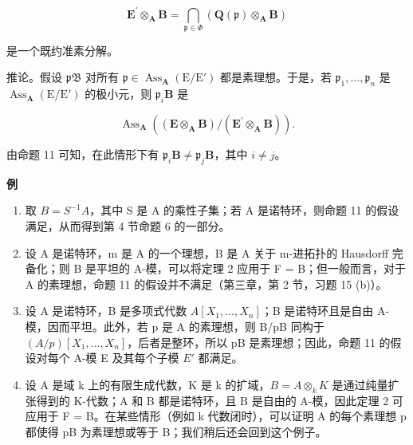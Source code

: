 \[
\mathbf {E} ^ {\prime} \otimes_ {\mathbf {A}} \mathbf {B} = \bigcap_ {\mathfrak {p} \in \Phi} (\mathbf {Q} (\mathfrak {p}) \otimes_ {\mathbf {A}} \mathbf {B})
\]

  是一个既约准素分解。

推论。假设 \(\mathfrak{pB}\) 对所有 \(\mathfrak{p} \in \operatorname{Ass}_{\mathbf{A}}(\mathrm{E}/\mathrm{E}')\) 都是素理想。于是，若 \(\mathfrak{p}_1, \ldots, \mathfrak{p}_n\) 是 \(\operatorname{Ass}_{\mathbf{A}}(\mathrm{E}/\mathrm{E}')\) 的极小元，则 \(\mathfrak{p}_i\mathbf{B}\) 是

\[
\operatorname{Ass} _ {\mathbf {A}} ((\mathbf {E} \otimes_ {\mathbf {A}} \mathbf {B}) / (\mathbf {E} ^ {\prime} \otimes_ {\mathbf {A}} \mathbf {B})).
\]

  由命题 11 可知，在此情形下有 \(\mathfrak{p}_i\mathbf{B} \neq \mathfrak{p}_j\mathbf{B}\)，其中 \(i \neq j\)。

\textbf{例}\par

\begin{enumerate}
\def\labelenumi{(\arabic{enumi})}
\item
  取 \(B = S^{-1}A\)，其中 S 是 A 的乘性子集；若 A 是诺特环，则命题 11 的假设满足，从而得到第 4 节命题 6 的一部分。
\item
  设 A 是诺特环，m 是 A 的一个理想，B 是 A 关于 m-进拓扑的 Hausdorff 完备化；则 B 是平坦的 A-模，可以将定理 2 应用于 F = B；但一般而言，对于 A 的素理想，命题 11 的假设并不满足（第三章，第 2 节，习题 15 (b)）。
\item
  设 A 是诺特环，B 是多项式代数 \(A[X_{1},\ldots,X_{n}]\)；B 是诺特环且是自由 A-模，因而平坦。此外，若 p 是 A 的素理想，则 B/pB 同构于 \((A/p)[X_{1},\ldots,X_{n}]\)，后者是整环，所以 pB 是素理想；因此，命题 11 的假设对每个 A-模 E 及其每个子模 \(E'\) 都满足。
\item
  设 A 是域 k 上的有限生成代数，K 是 k 的扩域，\(B = A \otimes_{k} K\) 是通过纯量扩张得到的 K-代数；A 和 B 都是诺特环，且 B 是自由的 A-模，因此定理 2 可应用于 F = B。在某些情形（例如 k 代数闭时），可以证明 A 的每个素理想 p 都使得 pB 为素理想或等于 B；我们稍后还会回到这个例子。
\end{enumerate}

